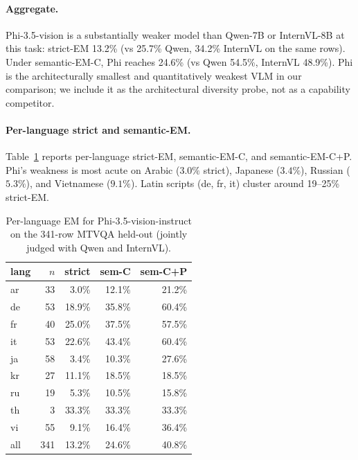 \paragraph{Aggregate.}
Phi-3.5-vision is a substantially weaker model than Qwen-7B or InternVL-8B at this task: strict-EM 13.2\% (vs 25.7\% Qwen, 34.2\% InternVL on the same rows). Under semantic-EM-C, Phi reaches 24.6\% (vs Qwen 54.5\%, InternVL 48.9\%). Phi is the architecturally smallest and quantitatively weakest VLM in our comparison; we include it as the architectural diversity probe, not as a capability competitor.

\paragraph{Per-language strict and semantic-EM.}
Table~\ref{tab:phi-perlang} reports per-language strict-EM, semantic-EM-C, and semantic-EM-C+P. Phi's weakness is most acute on Arabic ($3.0\%$ strict), Japanese ($3.4\%$), Russian ($5.3\%$), and Vietnamese ($9.1\%$). Latin scripts (de, fr, it) cluster around 19--25\% strict-EM.

\begin{table}[t]
\centering
\small
\begin{tabular}{lrrrr}
\toprule
lang & $n$ & strict & sem-C & sem-C+P \\
\midrule
ar & 33 & 3.0\%  & 12.1\% & 21.2\% \\
de & 53 & 18.9\% & 35.8\% & 60.4\% \\
fr & 40 & 25.0\% & 37.5\% & 57.5\% \\
it & 53 & 22.6\% & 43.4\% & 60.4\% \\
ja & 58 & 3.4\%  & 10.3\% & 27.6\% \\
kr & 27 & 11.1\% & 18.5\% & 18.5\% \\
ru & 19 & 5.3\%  & 10.5\% & 15.8\% \\
th & 3  & 33.3\% & 33.3\% & 33.3\% \\
vi & 55 & 9.1\%  & 16.4\% & 36.4\% \\
\midrule
all & 341 & 13.2\% & 24.6\% & 40.8\% \\
\bottomrule
\end{tabular}
\caption{Per-language EM for Phi-3.5-vision-instruct on the 341-row MTVQA held-out (jointly judged with Qwen and InternVL).}
\label{tab:phi-perlang}
\end{table}

